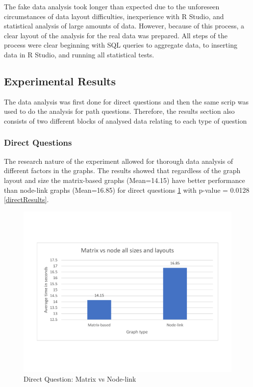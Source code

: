 \documentclass{l4proj}
\begin{document}
The fake data analysis took longer than expected due to the unforeseen circumstances of data layout difficulties, inexperience with R Studio, and statistical analysis of large amounts of data. However, because of this process, a clear layout of the analysis for the real data was prepared. All steps of the process were clear beginning with SQL queries to aggregate data, to inserting data in R Studio, and running all statistical tests.

\subsection{Experimental Results}

The data analysis was first done for direct questions and then the same scrip was used to do the analysis for path questions. Therefore, the results section also consists of two different blocks of analysed data relating to each type of question

\subsubsection{Direct Questions}

The research nature of the experiment allowed for thorough data analysis of different factors in the graphs. The results showed that regardless of the graph layout and size the matrix-based graphs (Mean=14.15) have better performance than node-link graphs (Mean=16.85) for direct questions \ref{nodevsmatrixdirect} with p-value = 0.0128 \ref{directResults}. 

\begin{figure}[H]
\centering
\includegraphics[width=15cm]{nodevsmatrixdirect.pdf}
\caption{Direct Question: Matrix vs Node-link}
\label{nodevsmatrixdirect}
\end{figure}
\end{document}
